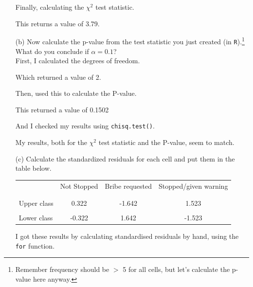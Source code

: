 \documentclass[12pt,letterpaper]{article}
\begin{document}
\begin{enumerate}
	Finally, calculating the $\chi^2$ test statistic.
	
	 
	
	This returns a value of 3.79.
	
	\item [(b)]
	Now calculate the p-value from the test statistic you just created (in \texttt{R}).\footnote{Remember frequency should be $>$ 5 for all cells, but let's calculate the p-value here anyway.}  What do you conclude if $\alpha = 0.1$?\\
	First, I calculated the degrees of freedom.
	
		 
		
	Which returned a value of 2.
	
	Then, used this to calculate the P-value.
		
		
		
	This returned a value of 0.1502 
	
	And I checked my results using \texttt{chisq.test()}.
	
		 
		
	My results, both for the $\chi^2$ test statistic and the P-value, seem to match.
	
	\item [(c)] Calculate the standardized residuals for each cell and put them in the table below.
	\vspace{1cm}
	
	\begin{table}[h]
		\centering
		\begin{tabular}{l | c c c }
			& Not Stopped & Bribe requested & Stopped/given warning \\
			\\[-1.8ex] 
			\hline \\[-1.8ex]
			Upper class  & 0.322 & -1.642 & 1.523 \\
			\\
			Lower class & -0.322 & 1.642 & -1.523  \\
			
		\end{tabular}
	\end{table}
	
	I got these results by calculating standardised residuals by hand, using the \texttt{for} function.
	

\end{enumerate}
\end{document}
